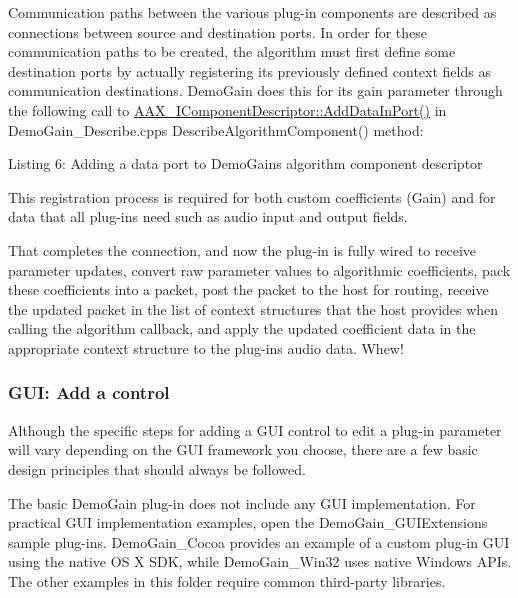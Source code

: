 Communication paths between the various plug-\/in components are described as connections between source and destination ports. In order for these communication paths to be created, the algorithm must first define some destination ports by actually registering its previously defined context fields as communication destinations. Demo\+Gain does this for its gain parameter through the following call to \mbox{\hyperlink{a01781_a230293b9f6bb413626cd487ca501df75}{A\+A\+X\+\_\+\+I\+Component\+Descriptor\+::\+Add\+Data\+In\+Port()}} in Demo\+Gain\+\_\+\+Describe.\+cpp\textquotesingle{}s {\ttfamily Describe\+Algorithm\+Component()} method\+:


\begin{DoxyCode}{0}
\end{DoxyCode}
  Listing 6\+: Adding a data port to Demo\+Gain\textquotesingle{}s algorithm component descriptor

This registration process is required for both custom coefficients (Gain) and for data that all plug-\/ins need such as audio input and output fields.

That completes the connection, and now the plug-\/in is fully wired to receive parameter updates, convert raw parameter values to algorithmic coefficients, pack these coefficients into a packet, post the packet to the host for routing, receive the updated packet in the list of context structures that the host provides when calling the algorithm callback, and apply the updated coefficient data in the appropriate context structure to the plug-\/in\textquotesingle{}s audio data. Whew! \hypertarget{a00794_subsection__gui_add_a_control}{}\subsubsection{G\+U\+I\+: Add a control}\label{a00794_subsection__gui_add_a_control}
 Although the specific steps for adding a G\+UI control to edit a plug-\/in parameter will vary depending on the G\+UI framework you choose, there are a few basic design principles that should always be followed.

The basic Demo\+Gain plug-\/in does not include any G\+UI implementation. For practical G\+UI implementation examples, open the Demo\+Gain\+\_\+\+G\+U\+I\+Extensions sample plug-\/ins. Demo\+Gain\+\_\+\+Cocoa provides an example of a custom plug-\/in G\+UI using the native OS X S\+DK, while Demo\+Gain\+\_\+\+Win32 uses native Windows A\+P\+Is. The other examples in this folder require common third-\/party libraries.

